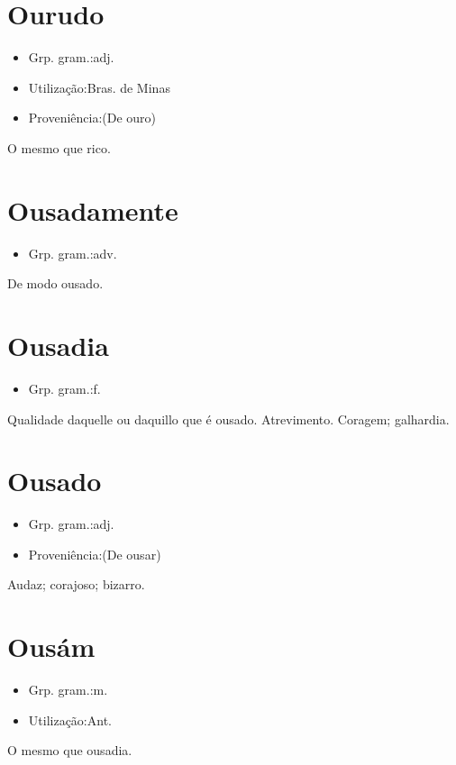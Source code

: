 \section{Ourudo}
\begin{itemize}
\item {Grp. gram.:adj.}
\end{itemize}
\begin{itemize}
\item {Utilização:Bras. de Minas}
\end{itemize}
\begin{itemize}
\item {Proveniência:(De \textunderscore ouro\textunderscore )}
\end{itemize}
O mesmo que \textunderscore rico\textunderscore .
\section{Ousadamente}
\begin{itemize}
\item {Grp. gram.:adv.}
\end{itemize}
De modo ousado.
\section{Ousadia}
\begin{itemize}
\item {Grp. gram.:f.}
\end{itemize}
Qualidade daquelle ou daquillo que é ousado.
Atrevimento.
Coragem; galhardia.
\section{Ousado}
\begin{itemize}
\item {Grp. gram.:adj.}
\end{itemize}
\begin{itemize}
\item {Proveniência:(De \textunderscore ousar\textunderscore )}
\end{itemize}
Audaz; corajoso; bizarro.
\section{Ousám}
\begin{itemize}
\item {Grp. gram.:m.}
\end{itemize}
\begin{itemize}
\item {Utilização:Ant.}
\end{itemize}
O mesmo que \textunderscore ousadia\textunderscore .
